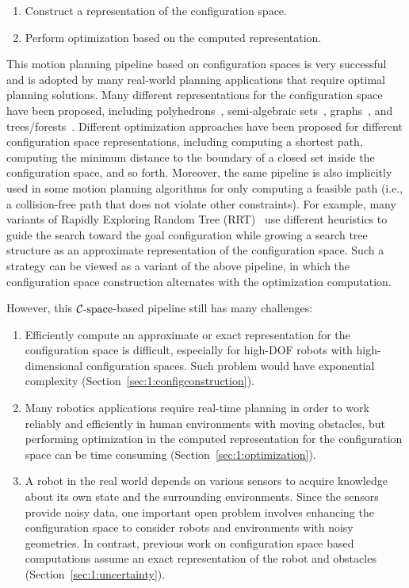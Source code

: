 \begin{enumerate}
\item Construct a representation of the configuration space.
\item Perform optimization based on the computed representation.
\end{enumerate}

This motion planning pipeline based on configuration spaces is very successful and is adopted by many real-world planning applications that require optimal planning solutions. Many different representations for the configuration space have been proposed, including polyhedrons~\cite{Chazelle:ADS:1987}, semi-algebraic sets~\cite{Canny:1988:AGC,Canny:1988:CKP}, graphs~\cite{Kavraki96}, and trees/forests~\cite{Kuffner00}. Different optimization approaches have been proposed for different configuration space representations, including computing a shortest path, computing the minimum distance to the boundary of a closed set inside the configuration space, and so forth. Moreover, the same pipeline is also implicitly used in some motion planning algorithms for only computing a feasible path (i.e., a collision-free path that does not violate other constraints). For example, many variants of Rapidly Exploring Random Tree (RRT)~\cite{Kuffner00} use different heuristics to guide the search toward the goal configuration while growing a search tree structure as an approximate representation of the configuration space. Such a strategy can be viewed as a variant of the above pipeline, in which the configuration space construction alternates with the optimization computation.


However, this $\mathcal C\text{-space}$-based pipeline still has many challenges:
\begin{enumerate}
\item Efficiently compute an approximate or exact representation for the configuration space is difficult, especially for high-DOF robots with high-dimensional configuration spaces. Such problem would have exponential complexity (Section~\ref{sec:1:configconstruction}).
\item Many robotics applications require real-time planning in order to work reliably and efficiently in human environments with moving obstacles, but performing optimization in the computed representation for the configuration space can be time consuming (Section~\ref{sec:1:optimization}).
\item A robot in the real world depends on various sensors to acquire knowledge about its own state and the surrounding environments. Since the sensors provide noisy data, one important open problem involves enhancing the configuration space to consider robots and environments with noisy geometries. In contrast, previous work on configuration space based computations assume an exact representation of the robot and obstacles (Section~\ref{sec:1:uncertainty}).
\end{enumerate}


